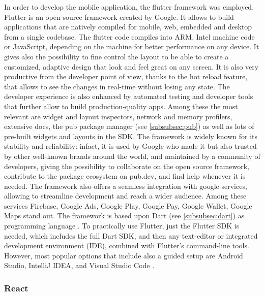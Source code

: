 In order to develop the mobile application, the flutter framework was employed. Flutter is an open-source framework created by Google. It allows to build applications that are natively compiled for mobile, web, embedded and desktop from a single codebase. The flutter code compiles into ARM, Intel machine code or JavaScript, depending on the machine for better performance on any device. It gives also the possibility to fine control the layout to be able to create a customized, adaptive design that look and feel great on any screen. It is also very productive from the developer point of view, thanks to the hot reload feature, that allows to see the changes in real-time without losing any state. The developer experience is also enhanced by automated testing and developer tools that further allow to build production-quality apps. Among these the most relevant are widget and layout inspectors, network and memory profilers, extensive docs, the pub package manager (see \cref{subsubsec:pub}) as well as lots of pre-built widgets and layouts in the SDK. The framework is widely known for its stability and reliability: infact, it is used by Google who made it but also trusted by other well-known brands around the world, and maintained by a community of developers, giving the possibility to collaborate on the open source framework, contribute to the package ecosystem on pub.dev, and find help whenever it is needed. The framework also offers a seamless integration with google services, allowing to streamline development and reach a wider audience. Among these services Firebase, Google Ads, Google Play, Google Pay, Google Wallet, Google Maps stand out. The framework is based upon Dart (see \cref{subsubsec:dart}) as programming language \cite{Flutter}. To practically use Flutter, just the Flutter SDK is needed, which includes the full Dart SDK, and then any text-editor or integrated development environment (IDE), combined with Flutter's command-line tools. However, most popular options that include also a guided setup are Android Studio, IntelliJ IDEA, and Visual Studio Code \cite{FlutterGetStarted}.

\newpage

\subsubsection{React}

